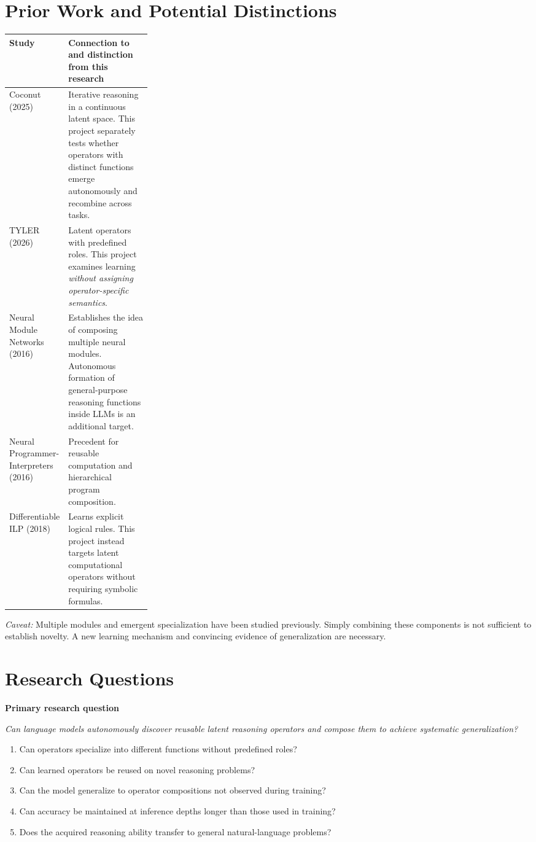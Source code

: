 \documentclass[11pt,a4paper]{article}
\newcommand{\tblhead}[1]{\textbf{#1}}
\begin{document}
\section{Prior Work and Potential Distinctions}
\begin{tabularx}{\linewidth}{@{}p{0.27\linewidth}X@{}}
\toprule
\tblhead{Study} & \tblhead{Connection to and distinction from this research}\\
\midrule
Coconut (2025) & Iterative reasoning in a continuous latent space. This project separately tests whether operators with distinct functions emerge autonomously and recombine across tasks.\\
TYLER (2026) & Latent operators with predefined roles. This project examines learning \emph{without assigning operator-specific semantics}.\\
Neural Module Networks (2016) & Establishes the idea of composing multiple neural modules. Autonomous formation of general-purpose reasoning functions inside LLMs is an additional target.\\
Neural Programmer-Interpreters (2016) & Precedent for reusable computation and hierarchical program composition.\\
Differentiable ILP (2018) & Learns explicit logical rules. This project instead targets latent computational operators without requiring symbolic formulas.\\
\bottomrule
\end{tabularx}
\textit{Caveat:} Multiple modules and emergent specialization have been studied previously. Simply combining these components is not sufficient to establish novelty. A new learning mechanism and convincing evidence of generalization are necessary.

\section{Research Questions}
\textbf{Primary research question}

\emph{Can language models autonomously discover reusable latent reasoning operators and compose them to achieve systematic generalization?}

\begin{enumerate}[label=RQ\arabic*.]
\item Can operators specialize into different functions without predefined roles?
\item Can learned operators be reused on novel reasoning problems?
\item Can the model generalize to operator compositions not observed during training?
\item Can accuracy be maintained at inference depths longer than those used in training?
\item Does the acquired reasoning ability transfer to general natural-language problems?
\end{enumerate}
\end{document}
